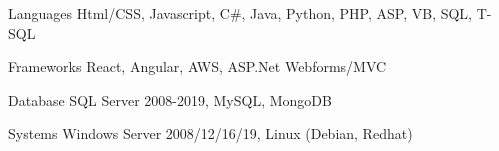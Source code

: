 
\begin{cvskills}
  \cvskill
    {Languages} %
    {Html/CSS, Javascript, C#, Java, Python, PHP, ASP, VB, SQL, T-SQL}  %

  \cvskill
    {Frameworks} %
    {React, Angular, AWS, ASP.Net Webforms/MVC} %

  \cvskill
    {Database} %
    {SQL Server 2008-2019, MySQL, MongoDB} %

  \cvskill
    {Systems} %
    {Windows Server 2008/12/16/19, Linux (Debian, Redhat)} %
    
\end{cvskills}
